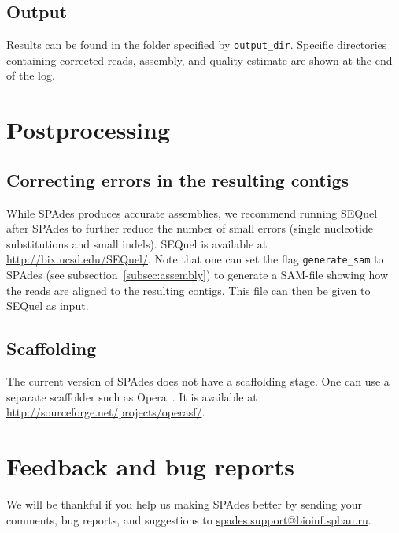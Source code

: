 \documentclass{article}
\def\spades{SPAdes}
\begin{document}
\subsection{Output}
Results can be found in the folder specified by {\tt output\_dir}.
Specific directories containing corrected reads, assembly, and quality estimate are shown at the end of the log.

\section{Postprocessing}

\subsection{Correcting errors in the resulting contigs}
While {\spades} produces accurate assemblies, 
we recommend running SEQuel~\cite{sequel} after {\spades} to further reduce the number of small errors
(single nucleotide substitutions and small indels). SEQuel is available at
\url{http://bix.ucsd.edu/SEQuel/}. Note that one can set the flag {\tt generate\_sam} to {\spades}
(see subsection~\ref{subsec:assembly}) to generate a SAM-file showing how the 
reads are aligned to the resulting contigs. This file can then be given to SEQuel as input.

\subsection{Scaffolding}
The current version of {\spades} does not have a scaffolding stage.
One can use a separate scaffolder such as Opera~\cite{opera}.
It is available at \url{http://sourceforge.net/projects/operasf/}.

\section{Feedback and bug reports}
We will be thankful if you help us making {\spades} better
by sending your comments, bug reports, and suggestions to
\url{spades.support@bioinf.spbau.ru}.




\end{document}

